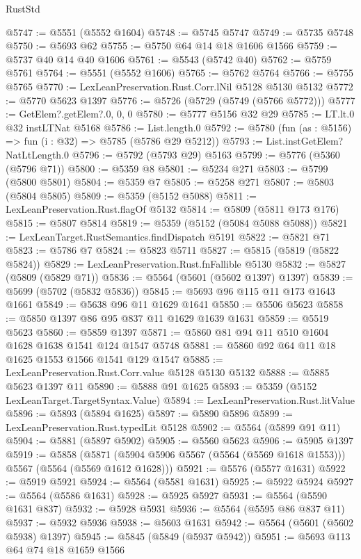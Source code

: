 \begin{lexlean}{RustStd}
\begin{coremodule}
@5747 := @5551 (@5552 @1604)
@5748 := @5745 @5747
@5749 := @5735 @5748
@5750 := @5693 @62
@5755 := @5750 @64 @14 @18 @1606 @1566
@5759 := @5737 @40 @14 @40 @1606
@5761 := @5543 (@5742 @40)
@5762 := @5759 @5761
@5764 := @5551 (@5552 @1606)
@5765 := @5762 @5764
@5766 := @5755 @5765
@5770 := LexLeanPreservation.Rust.Corr.lNil @5128 @5130 @5132
@5772 := @5770 @5623 @1397
@5776 := @5726 (@5729 (@5749 (@5766 @5772)))
@5777 := GetElem?.getElem?.{0, 0, 0}
@5780 := @5777 @5156 @32 @29
@5785 := LT.lt.{0} @32 instLTNat @5168
@5786 := List.length.{0}
@5792 := @5780 (fun (as : @5156) => fun (i : @32) => @5785 (@5786 @29 @5212))
@5793 := List.instGetElem?NatLtLength.{0}
@5796 := @5792 (@5793 @29) @5163
@5799 := @5776 (@5360 (@5796 @71))
@5800 := @5359 @8
@5801 := @5234 @271
@5803 := @5799 (@5800 @5801)
@5804 := @5359 @7
@5805 := @5258 @271
@5807 := @5803 (@5804 @5805)
@5809 := @5359 (@5152 @5088)
@5811 := LexLeanPreservation.Rust.flagOf @5132
@5814 := @5809 (@5811 @173 @176)
@5815 := @5807 @5814
@5819 := @5359 (@5152 (@5084 @5088 @5088))
@5821 := LexLeanTarget.RustSemantics.findDispatch @5191
@5822 := @5821 @71
@5823 := @5786 @7
@5824 := @5823 @5711
@5827 := @5815 (@5819 (@5822 @5824))
@5829 := LexLeanPreservation.Rust.fnFallible @5130
@5832 := @5827 (@5809 (@5829 @71))
@5836 := @5564 (@5601 (@5602 @1397) @1397)
@5839 := @5699 (@5702 (@5832 @5836))
@5845 := @5693 @96 @115 @11 @173 @1643 @1661
@5849 := @5638 @96 @11 @1629 @1641
@5850 := @5506 @5623
@5858 := @5850 @1397 @86 @95 @837 @11 @1629 @1639 @1631
@5859 := @5519 @5623
@5860 := @5859 @1397
@5871 := @5860 @81 @94 @11 @510 @1604 @1628 @1638 @1541 @124 @1547 @5748
@5881 := @5860 @92 @64 @11 @18 @1625 @1553 @1566 @1541 @129 @1547
@5885 := LexLeanPreservation.Rust.Corr.value @5128 @5130 @5132
@5888 := @5885 @5623 @1397 @11
@5890 := @5888 @91 @1625
@5893 := @5359 (@5152 LexLeanTarget.TargetSyntax.Value)
@5894 := LexLeanPreservation.Rust.litValue
@5896 := @5893 (@5894 @1625)
@5897 := @5890 @5896
@5899 := LexLeanPreservation.Rust.typedLit @5128
@5902 := @5564 (@5899 @91 @11)
@5904 := @5881 (@5897 @5902)
@5905 := @5560 @5623
@5906 := @5905 @1397
@5919 := @5858
    (@5871 (@5904 @5906 @5567 (@5564 (@5569 @1618 @1553))) @5567 (@5564 (@5569 @1612 @1628)))
@5921 := @5576 (@5577 @1631)
@5922 := @5919 @5921
@5924 := @5564 (@5581 @1631)
@5925 := @5922 @5924
@5927 := @5564 (@5586 @1631)
@5928 := @5925 @5927
@5931 := @5564 (@5590 @1631 @837)
@5932 := @5928 @5931
@5936 := @5564 (@5595 @86 @837 @11)
@5937 := @5932 @5936
@5938 := @5603 @1631
@5942 := @5564 (@5601 (@5602 @5938) @1397)
@5945 := @5845 (@5849 (@5937 @5942))
@5951 := @5693 @113 @64 @74 @18 @1659 @1566

\end{coremodule}
\end{lexlean}
